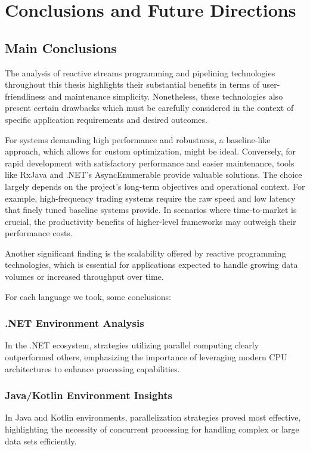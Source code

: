 \chapter{Conclusions and Future Directions}

\section{Main Conclusions}
The analysis of reactive streams programming and pipelining technologies throughout this thesis highlights their substantial benefits in terms of user-friendliness and maintenance simplicity. Nonetheless, these technologies also present certain drawbacks which must be carefully considered in the context of specific application requirements and desired outcomes.

For systems demanding high performance and robustness, a baseline-like approach, which allows for custom optimization, might be ideal. Conversely, for rapid development with satisfactory performance and easier maintenance, tools like RxJava and .NET's AsyncEnumerable provide valuable solutions. The choice largely depends on the project's long-term objectives and operational context. For example, high-frequency trading systems require the raw speed and low latency that finely tuned baseline systems provide. In scenarios where time-to-market is crucial, the productivity benefits of higher-level frameworks may outweigh their performance costs.

Another significant finding is the scalability offered by reactive programming technologies, which is essential for applications expected to handle growing data volumes or increased throughput over time.

For each language we took, some conclusions:

\subsection{.NET Environment Analysis}
In the .NET ecosystem, strategies utilizing parallel computing clearly outperformed others, emphasizing the importance of leveraging modern CPU architectures to enhance processing capabilities.

\subsection{Java/Kotlin Environment Insights}
In Java and Kotlin environments, parallelization strategies proved most effective, highlighting the necessity of concurrent processing for handling complex or large data sets efficiently.

